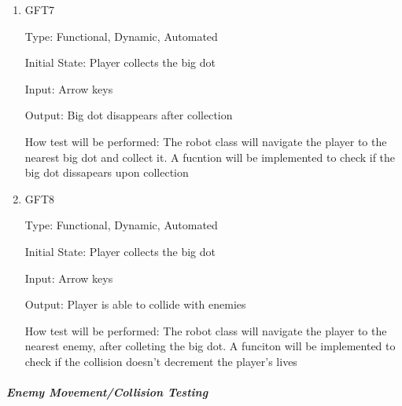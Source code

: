 \documentclass[12pt, titlepage]{article}
\begin{document}
\begin{enumerate}
\item{GFT7\\}

Type: Functional, Dynamic, Automated
					
Initial State: Player collects the big dot
					
Input: Arrow keys
					
Output: Big dot disappears after collection

How test will be performed: The robot class will navigate the player to the nearest big dot and collect it. A fucntion will be implemented to check if the big dot dissapears upon collection

\item{GFT8\\}

Type: Functional, Dynamic, Automated
					
Initial State: Player collects the big dot
					
Input: Arrow keys
					
Output: Player is able to collide with enemies

How test will be performed: The robot class will navigate the player to the nearest enemy, after colleting the big dot. A funciton will be implemented to check if the collision doesn't decrement the player's lives

\end{enumerate}

\subparagraph{Enemy Movement/Collision Testing}
\end{document}
